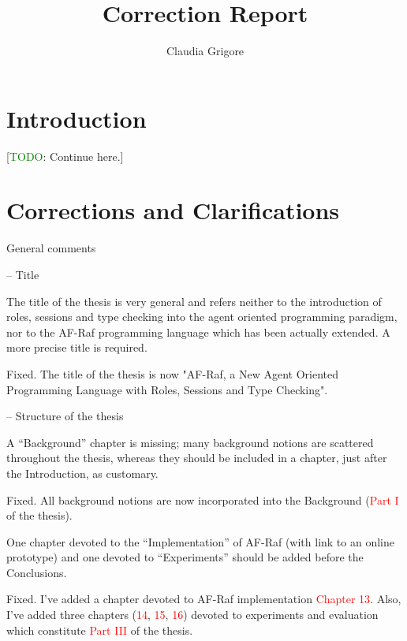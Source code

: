\documentclass{article}
\title{Correction Report}
\author{Claudia Grigore}
\newcommand*\R[1]{\textcolor{red}{#1}} %
\newcommand{\todo}[1]{[\textcolor{green}{TODO}: #1]}
\newenvironment{them}{\noindent\begingroup\color{blue}}{\endgroup\par}
\begin{document}
\maketitle

\section{Introduction}

\todo{Continue here.}
\section{Corrections and Clarifications}

\begin{them}
General comments
\end{them}


\begin{them}
-- Title

The title of the thesis is very general and refers neither to the introduction
of roles, sessions and type checking into the agent oriented programming
paradigm, nor to the AF-Raf programming language which has been actually
extended. A more precise title is required.

\end{them}
Fixed. The title of the thesis is now "AF-Raf, a New Agent Oriented Programming
Language with Roles, Sessions and Type Checking".

\begin{them}

-- Structure of the thesis

A “Background” chapter is missing; many background notions are scattered
throughout the thesis, whereas they should be included in a chapter, just after
the Introduction, as customary.

\end{them}
Fixed. All background notions are now incorporated into the Background (\R{Part
I} of the thesis).

\begin{them}

One chapter devoted to the “Implementation” of AF-Raf (with link to an online
prototype) and one devoted to “Experiments” should be added before the
Conclusions.

\end{them}
Fixed. I've added a chapter devoted to AF-Raf implementation \R{Chapter 13}.
Also, I've added three chapters (\R{14}, \R{15}, \R{16}) devoted to experiments
and evaluation which constitute \R{Part III} of the thesis.
\end{document}
